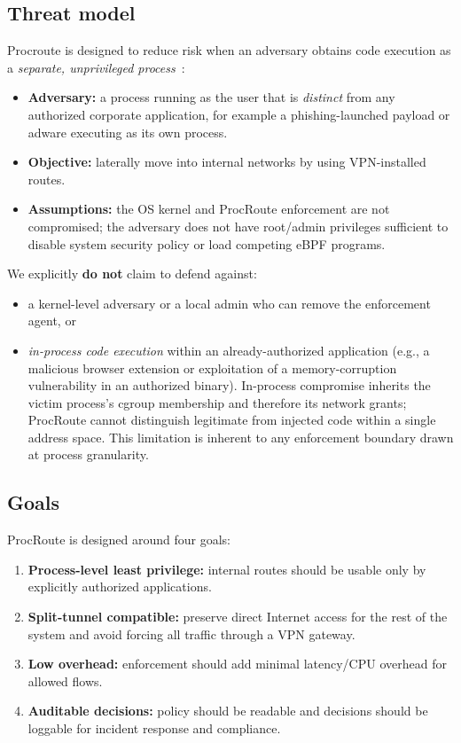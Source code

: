 \documentclass[sigconf]{acmart}
\begin{document}
\subsection{Threat model}
Procroute is designed to reduce risk when an adversary obtains code execution as a \emph{separate, unprivileged process}~\cite{mitre_lateral}:
\begin{itemize}
  \item \textbf{Adversary:} a process running as the user that is \emph{distinct} from any authorized corporate application, for example a phishing-launched payload or adware executing as its own process.
  \item \textbf{Objective:} laterally move into internal networks by using VPN-installed routes.
  \item \textbf{Assumptions:} the OS kernel and ProcRoute enforcement are not compromised; the adversary does not have root/admin privileges sufficient to disable system security policy or load competing eBPF programs.
\end{itemize}

We explicitly \textbf{do not} claim to defend against:
\begin{itemize}
  \item a kernel-level adversary or a local admin who can remove the enforcement agent, or
  \item \emph{in-process code execution} within an already-authorized
    application (e.g., a malicious browser extension or exploitation of
    a memory-corruption vulnerability in an authorized binary).
    In-process compromise inherits the victim process's cgroup
    membership and therefore its network grants; ProcRoute cannot
    distinguish legitimate from injected code within a single address
    space. This limitation is inherent to any enforcement boundary
    drawn at process granularity.
\end{itemize}

\subsection{Goals}
ProcRoute is designed around four goals:
\begin{enumerate}
  \item \textbf{Process-level least privilege:} internal routes should be usable only by explicitly authorized applications.
  \item \textbf{Split-tunnel compatible:} preserve direct Internet access for the rest of the system and avoid forcing all traffic through a VPN gateway.
  \item \textbf{Low overhead:} enforcement should add minimal latency/CPU overhead for allowed flows.
  \item \textbf{Auditable decisions:} policy should be readable and decisions should be loggable for incident response and compliance.
\end{enumerate}
\end{document}
